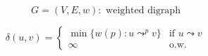 
\begin{frame}{}
  \begin{definition}
    \[
      G = (V, E, w): \text{ weighted digraph}
    \]

    \[
      \delta(u,v) = \begin{cases}
	\min \big\{ w(p): u \leadsto^{p} v \big\} & \text{if } u \leadsto v \\
	\infty	& \text{o.w.}
      \end{cases}
    \]
  \end{definition}

  \pause
  \vspace{0.60cm}
  \begin{center}
     \\[20pt]

  \end{center}
\end{frame}
